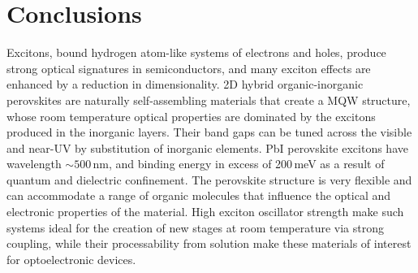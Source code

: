 \section{Conclusions}
Excitons, bound hydrogen atom-like systems of electrons and holes, produce strong optical signatures in semiconductors, and many exciton effects are enhanced by a reduction in dimensionality. 2D hybrid organic-inorganic perovskites are naturally self-assembling materials that create a MQW structure, whose room temperature optical properties are dominated by the excitons produced in the inorganic layers. Their band gaps can be tuned across the visible and near-UV by substitution of inorganic elements. PbI perovskite excitons have wavelength $\sim500$\,nm, and binding energy in excess of 200\,meV as a result of quantum and dielectric confinement. The perovskite structure is very flexible and can accommodate a range of organic molecules that influence the optical and electronic properties of the material. High exciton oscillator strength make such systems ideal for the creation of new stages at room temperature via strong coupling, while their processability from solution make these materials of interest for optoelectronic devices.